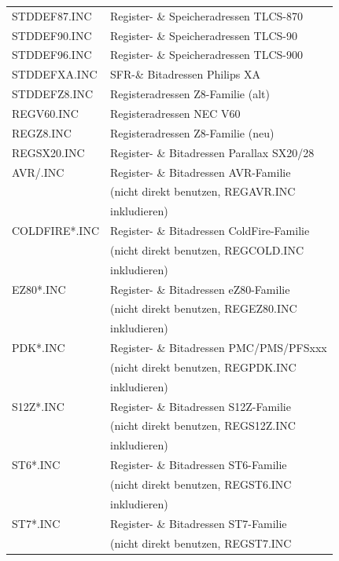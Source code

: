 \documentclass[12pt,a4paper,twoside]{report}
\begin{document}
\begin{center}
\begin{longtable}{|l|l|}
STDDEF87.INC      & Register- \& Speicheradressen TLCS-870 \\
STDDEF90.INC      & Register- \& Speicheradressen TLCS-90 \\
STDDEF96.INC      & Register- \& Speicheradressen TLCS-900 \\
STDDEFXA.INC      & SFR-\& Bitadressen Philips XA \\
STDDEFZ8.INC      & Registeradressen Z8-Familie (alt)\\
REGV60.INC        & Registeradressen NEC V60 \\
REGZ8.INC         & Registeradressen Z8-Familie (neu)\\
REGSX20.INC       & Register- \& Bitadressen Parallax SX20/28 \\
AVR/\*.INC        & Register- \& Bitadressen AVR-Familie \\
                  & (nicht direkt benutzen, REGAVR.INC \\
                  & inkludieren) \\
COLDFIRE\/*.INC   & Register- \& Bitadressen ColdFire-Familie \\
                  & (nicht direkt benutzen, REGCOLD.INC \\
                  & inkludieren) \\
EZ80\/*.INC       & Register- \& Bitadressen eZ80-Familie \\
                  & (nicht direkt benutzen, REGEZ80.INC \\
                  & inkludieren) \\
PDK\/*.INC        & Register- \& Bitadressen PMC/PMS/PFSxxx \\
                  & (nicht direkt benutzen, REGPDK.INC \\
                  & inkludieren) \\
S12Z\/*.INC       & Register- \& Bitadressen S12Z-Familie \\
                  & (nicht direkt benutzen, REGS12Z.INC \\
                  & inkludieren) \\
ST6\/*.INC        & Register- \& Bitadressen ST6-Familie \\
                  & (nicht direkt benutzen, REGST6.INC \\
                  & inkludieren) \\
ST7\/*.INC        & Register- \& Bitadressen ST7-Familie \\
                  & (nicht direkt benutzen, REGST7.INC \\

\end{longtable}
\end{center}
\end{document}
